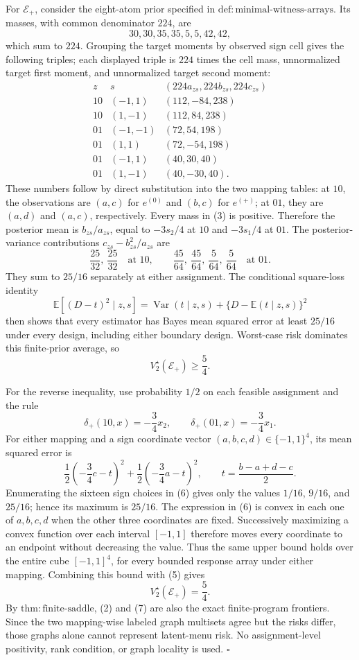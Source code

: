 For \(\mathcal E_+\), consider the eight-atom prior specified in \(\mathrm{def{:}minimal\text{-}witness\text{-}arrays}\).  Its masses, with common denominator \(224\), are
\[
 30,30,35,35,5,5,42,42,
\]
which sum to \(224\).  Grouping the target moments by observed sign cell gives the following triples; each displayed triple is \(224\) times the cell mass, unnormalized target first moment, and unnormalized target second moment:
\[
\begin{array}{c|c|c}
z& s &(224a_{zs},224b_{zs},224c_{zs})\\ \hline
10&(-1,1)&(112,-84,238)\\
10&(1,-1)&(112,84,238)\\ \hline
01&(-1,-1)&(72,54,198)\\
01&(1,1)&(72,-54,198)\\
01&(-1,1)&(40,30,40)\\
01&(1,-1)&(40,-30,40).
\end{array} \tag{3}
\]
These numbers follow by direct substitution into the two mapping tables: at \(10\), the observations are \((a,c)\) for \(e^{(0)}\) and \((b,c)\) for \(e^{(+)}\); at \(01\), they are \((a,d)\) and \((a,c)\), respectively.  Every mass in (3) is positive.  Therefore the posterior mean is \(b_{zs}/a_{zs}\), equal to \(-3s_2/4\) at \(10\) and \(-3s_1/4\) at \(01\).  The posterior-variance contributions \(c_{zs}-b_{zs}^2/a_{zs}\) are
\[
 \frac{25}{32},\ \frac{25}{32}
 \quad\text{at }10,
 \qquad
 \frac{45}{64},\ \frac{45}{64},\ \frac5{64},\ \frac5{64}
 \quad\text{at }01. \tag{4}
\]
They sum to \(25/16\) separately at either assignment.  The conditional square-loss identity
\[
 \mathbb E[(D-t)^2\mid z,s]
 =\operatorname{Var}(t\mid z,s)
  +\{D-\mathbb E(t\mid z,s)\}^2
\]
then shows that every estimator has Bayes mean squared error at least \(25/16\) under every design, including either boundary design.  Worst-case risk dominates this finite-prior average, so
\[
 V_2^\star(\mathcal E_+)\ge\frac54. \tag{5}
\]

For the reverse inequality, use probability \(1/2\) on each feasible assignment and the rule
\[
 \delta_+(10,x)=-\frac34x_2,
 \qquad
 \delta_+(01,x)=-\frac34x_1.
\]
For either mapping and a sign coordinate vector \((a,b,c,d)\in\{-1,1\}^4\), its mean squared error is
\[
 \frac12\left(-\frac34c-t\right)^2
 +\frac12\left(-\frac34a-t\right)^2,
 \qquad
 t=\frac{b-a+d-c}{2}. \tag{6}
\]
Enumerating the sixteen sign choices in (6) gives only the values
\(1/16\), \(9/16\), and \(25/16\); hence its maximum is \(25/16\).  The expression in (6) is convex in each one of \(a,b,c,d\) when the other three coordinates are fixed.  Successively maximizing a convex function over each interval \([-1,1]\) therefore moves every coordinate to an endpoint without decreasing the value.  Thus the same upper bound holds over the entire cube \([-1,1]^4\), for every bounded response array under either mapping.  Combining this bound with (5) gives
\[
 V_2^\star(\mathcal E_+)=\frac54. \tag{7}
\]
By \(\mathrm{thm{:}finite\text{-}saddle}\), (2) and (7) are also the exact finite-program frontiers.  Since the two mapping-wise labeled graph multisets agree but the risks differ, those graphs alone cannot represent latent-menu risk.  No assignment-level positivity, rank condition, or graph locality is used. \(\square\)